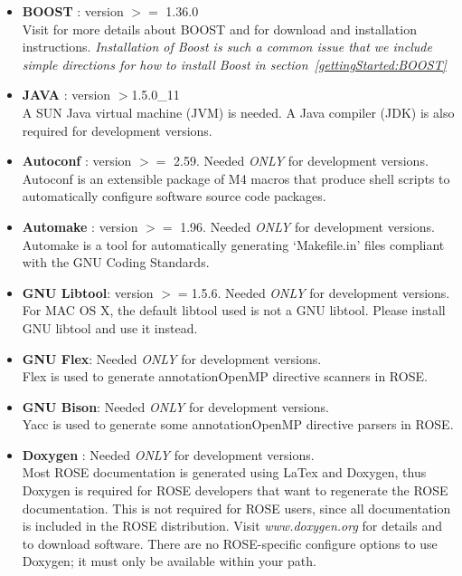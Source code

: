 \begin{itemize}
   \item {\bf BOOST} : version $>=$ 1.36.0  \\
     Visit 
     for more details about BOOST and 
     for download and installation instructions. 
     {\em Installation of Boost is such a common issue that we include simple directions for how to install Boost in section~\ref{gettingStarted:BOOST}}

   \item {\bf JAVA} : version $>$1.5.0\_11 \\
     A SUN Java virtual machine (JVM) is needed. A Java compiler (JDK) is also
     required for development versions.  

   \item {\bf Autoconf} : version $>=$ 2.59. Needed \emph{ONLY} for development versions. \\
     Autoconf is an extensible package of M4 macros that produce shell scripts to automatically configure software source code packages. 

   \item {\bf Automake} : version $>=$ 1.96. Needed \emph{ONLY} for development versions. \\
     Automake is a tool for automatically generating `Makefile.in' files compliant with
     the GNU Coding Standards.

   \item {\bf GNU Libtool}: version $>=$1.5.6.  Needed \emph{ONLY} for development versions. 
   For MAC OS X, the default libtool used is not a GNU libtool. Please
   install GNU libtool and use it instead.

   \item {\bf GNU Flex}: Needed \emph{ONLY} for development versions. \\
   Flex is used to generate annotation\/OpenMP directive scanners in ROSE. 

   \item {\bf GNU Bison}: Needed \emph{ONLY} for development versions. \\
   Yacc is used to generate some annotation\/OpenMP directive parsers in ROSE. 

   \item {\bf Doxygen} : Needed \emph{ONLY} for development versions. \\
          Most ROSE documentation is generated using LaTex and Doxygen, thus
          Doxygen is required for ROSE developers that want to regenerate the ROSE
          documentation. This is not required for ROSE users, since all documentation is 
          included in the ROSE distribution. Visit {\it www.doxygen.org} for details and to
          download software.  There are no ROSE-specific configure options to use Doxygen;
          it must only be available within your path.
 

\end{itemize}
